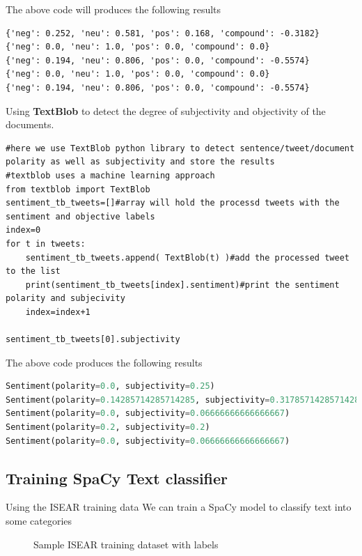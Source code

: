 The above code will produces the following results

\begin{lstlisting}
{'neg': 0.252, 'neu': 0.581, 'pos': 0.168, 'compound': -0.3182}
{'neg': 0.0, 'neu': 1.0, 'pos': 0.0, 'compound': 0.0}
{'neg': 0.194, 'neu': 0.806, 'pos': 0.0, 'compound': -0.5574}
{'neg': 0.0, 'neu': 1.0, 'pos': 0.0, 'compound': 0.0}
{'neg': 0.194, 'neu': 0.806, 'pos': 0.0, 'compound': -0.5574}
\end{lstlisting}




Using \textbf{TextBlob} to detect the degree of subjectivity and objectivity of the documents.


\begin{lstlisting}
#here we use TextBlob python library to detect sentence/tweet/document polarity as well as subjectivity and store the results
#textblob uses a machine learning approach
from textblob import TextBlob
sentiment_tb_tweets=[]#array will hold the processd tweets with the sentiment and objective labels
index=0
for t in tweets:
    sentiment_tb_tweets.append( TextBlob(t) )#add the processed tweet to the list
    print(sentiment_tb_tweets[index].sentiment)#print the sentiment polarity and subjecivity
    index=index+1
    
sentiment_tb_tweets[0].subjectivity
\end{lstlisting}


The above code produces the following results


\begin{lstlisting}[language=Python]
Sentiment(polarity=0.0, subjectivity=0.25)
Sentiment(polarity=0.14285714285714285, subjectivity=0.31785714285714284)
Sentiment(polarity=0.0, subjectivity=0.06666666666666667)
Sentiment(polarity=0.2, subjectivity=0.2)
Sentiment(polarity=0.0, subjectivity=0.06666666666666667)
\end{lstlisting}

\clearpage

\subsection{Training SpaCy Text classifier}
Using the ISEAR training data
We can train a SpaCy model to classify text into some categories
\begin{figure}[h]
  \centering
  \caption{Sample ISEAR training dataset with labels}
  \label{fig:ALAP:sm1}
\end{figure}

